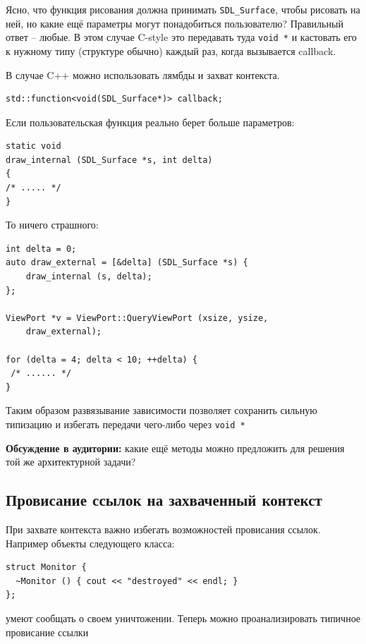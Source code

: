 \documentclass[a4paper,12pt,oneside]{book}
\begin{document}
Ясно, что функция рисования должна принимать \lstinline!SDL_Surface!, чтобы рисовать на ней, но какие ещё параметры могут понадобиться пользователю? Правильный ответ -- любые. В этом случае C-style это передавать туда \lstinline!void *! и кастовать его к нужному типу (структуре обычно) каждый раз, когда вызывается callback.

В случае C++ можно использовать лямбды и захват контекста.

\begin{lstlisting}
std::function<void(SDL_Surface*)> callback;
\end{lstlisting}

Если пользовательская функция реально берет больше параметров:

\begin{lstlisting}
static void
draw_internal (SDL_Surface *s, int delta)
{
/* ..... */
}
\end{lstlisting}

То ничего страшного:

\begin{lstlisting}
int delta = 0;
auto draw_external = [&delta] (SDL_Surface *s) { 
    draw_internal (s, delta); 
};

ViewPort *v = ViewPort::QueryViewPort (xsize, ysize, 
    draw_external);

for (delta = 4; delta < 10; ++delta) {
 /* ...... */
}
\end{lstlisting}

Таким образом развязывание зависимости позволяет сохранить сильную типизацию и избегать передачи чего-либо через \lstinline!void *!

\textbf{Обсуждение в аудитории:} какие ещё методы можно предложить для решения той же архитектурной задачи?

\subsection{Провисание ссылок на захваченный контекст}\label{DanglingContext}

При захвате контекста важно избегать возможностей провисания ссылок. Например объекты следующего класса:

\begin{lstlisting}
struct Monitor {
  ~Monitor () { cout << "destroyed" << endl; }
};
\end{lstlisting}

умеют сообщать о своем уничтожении. Теперь можно проанализировать типичное провисание ссылки
\end{document}
